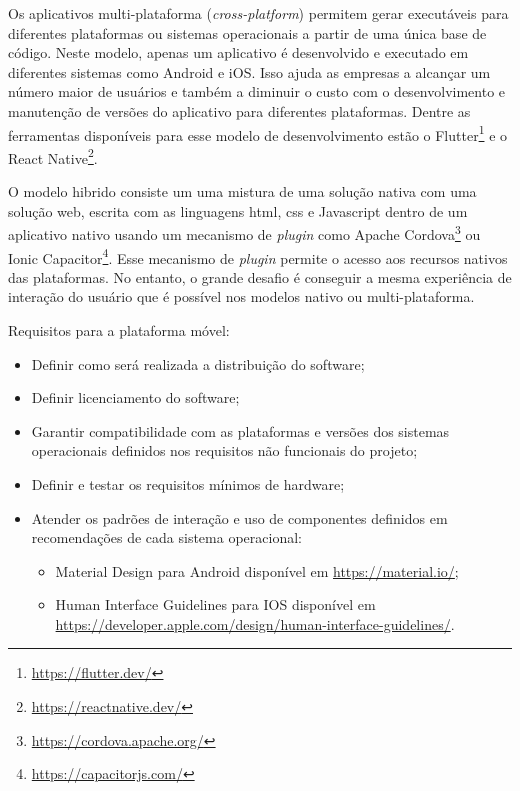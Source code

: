 Os aplicativos multi-plataforma (\emph{cross-platform}) permitem gerar executáveis para diferentes plataformas ou sistemas operacionais a partir de uma única base de código. Neste modelo, apenas um aplicativo é desenvolvido e executado em diferentes sistemas como Android e iOS. Isso ajuda as empresas a alcançar um número maior de usuários e também a diminuir o custo com o desenvolvimento e manutenção de versões do aplicativo para diferentes plataformas. Dentre as ferramentas disponíveis para esse modelo de desenvolvimento estão o Flutter\footnote{\url{https://flutter.dev/}} e o React Native\footnote{\url{https://reactnative.dev/}}.

O modelo hibrido consiste um uma mistura de uma solução nativa com uma solução web, escrita com as linguagens \ac{html}, \ac{css} e Javascript dentro de um aplicativo nativo usando um mecanismo de \emph{plugin} como Apache Cordova\footnote{\url{https://cordova.apache.org/}} ou Ionic Capacitor\footnote{\url{https://capacitorjs.com/}}. Esse mecanismo de \emph{plugin} permite o acesso aos recursos nativos das plataformas. No entanto, o grande desafio é conseguir a mesma experiência de interação do usuário que é possível nos modelos nativo ou multi-plataforma.

Requisitos para a plataforma móvel: 

\begin{itemize}
  \item Definir como será realizada a distribuição do software;
  
  \item Definir licenciamento do software;
  
  \item Garantir compatibilidade com as plataformas e versões dos sistemas operacionais definidos nos requisitos não funcionais do projeto;
  
  \item Definir e testar os requisitos mínimos de hardware;
  
  \item Atender os padrões de interação e uso de componentes definidos em recomendações de cada sistema operacional:
  
  \begin{itemize}
      \item Material Design para Android disponível em \url{https://material.io/};
      
      \item Human Interface Guidelines para IOS disponível em \url{https://developer.apple.com/design/human-interface-guidelines/}.
  \end{itemize}
  
\end{itemize}


